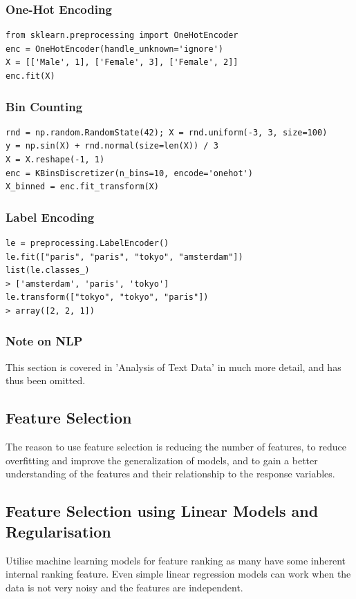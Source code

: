\documentclass[11pt]{article}
\theoremstyle{definition}
\begin{document}
\subsubsection{One-Hot Encoding}
\begin{verbatim}
from sklearn.preprocessing import OneHotEncoder
enc = OneHotEncoder(handle_unknown='ignore')
X = [['Male', 1], ['Female', 3], ['Female', 2]]
enc.fit(X)
\end{verbatim}

\subsubsection{Bin Counting}
\begin{verbatim}
rnd = np.random.RandomState(42); X = rnd.uniform(-3, 3, size=100)
y = np.sin(X) + rnd.normal(size=len(X)) / 3
X = X.reshape(-1, 1)
enc = KBinsDiscretizer(n_bins=10, encode='onehot')
X_binned = enc.fit_transform(X)
\end{verbatim}

\subsubsection{Label Encoding}
\begin{verbatim}
le = preprocessing.LabelEncoder()
le.fit(["paris", "paris", "tokyo", "amsterdam"])
list(le.classes_)
> ['amsterdam', 'paris', 'tokyo']
le.transform(["tokyo", "tokyo", "paris"])
> array([2, 2, 1])
\end{verbatim}

\subsubsection{Note on NLP}
This section is covered in 'Analysis of Text Data' in much more detail, and has thus been omitted.

\subsection{Feature Selection}
The reason to use feature selection is reducing the number of features, to reduce overfitting and improve the generalization of models, and to gain  a better understanding of the features and their relationship to the response variables.

\subsection{Feature Selection using Linear Models and Regularisation}
Utilise machine learning models for feature ranking as many have some inherent internal ranking feature. Even simple linear regression
models can work when the data is not very noisy and the features are independent.
\end{document}
